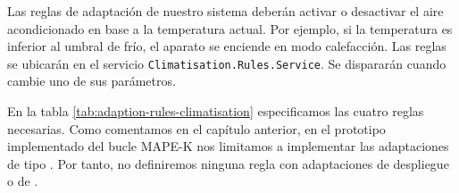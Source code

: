 Las reglas de adaptación de nuestro sistema deberán activar o desactivar el aire acondicionado en base a la temperatura actual. Por ejemplo, si la temperatura es inferior al umbral de frío, el aparato se enciende en modo calefacción. Las reglas se ubicarán en el servicio \texttt{Climatisation.Rules.Service}. Se dispararán cuando cambie uno de sus parámetros.

En la tabla \ref{tab:adaption-rules-climatisation} especificamos las cuatro reglas necesarias. Como comentamos en el capítulo anterior, en el prototipo implementado del bucle MAPE-K nos limitamos a implementar las adaptaciones de tipo . Por tanto, no definiremos ninguna regla con adaptaciones de despliegue o de .

\pagebreak

